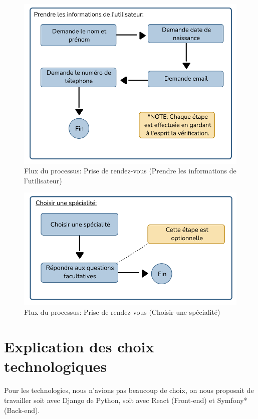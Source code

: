 \begin{figure}[H] 
    \centering
    \includegraphics[scale=0.9]{Figures/cbf_user.png}
    \caption{Flux du processus: Prise de rendez-vous (Prendre les informations de l'utilisateur)}
\end{figure}


\begin{figure}[H] 
    \centering
    \includegraphics[scale=0.9]{Figures/cbf_specialite.png}
    \caption{Flux du processus: Prise de rendez-vous (Choisir une spécialité)}
\end{figure}


\section{Explication des choix technologiques}

\hspace{16pt}Pour les technologies, nous n'avions pas beaucoup de choix, on nous proposait de travailler soit avec Django de Python, soit avec React (Front-end) et Symfony* (Back-end).

